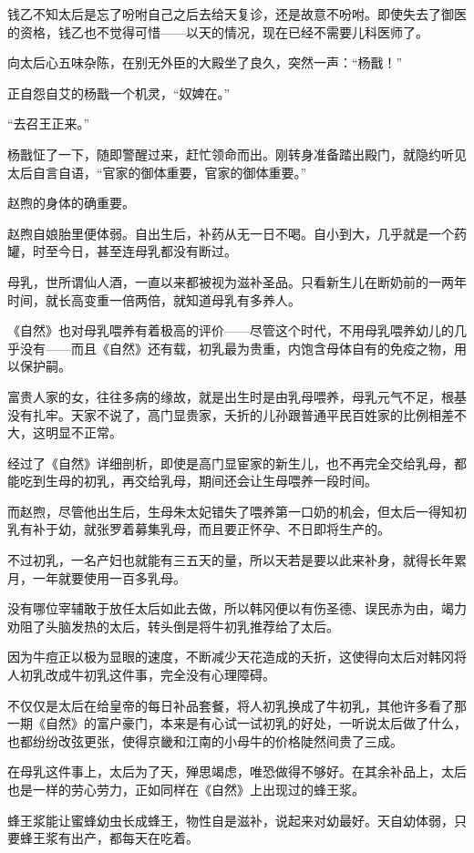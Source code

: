 钱乙不知太后是忘了吩咐自己之后去给天复诊，还是故意不吩咐。即使失去了御医的资格，钱乙也不觉得可惜——以天的情况，现在已经不需要儿科医师了。

向太后心五味杂陈，在别无外臣的大殿坐了良久，突然一声：“杨戬！”

正自怨自艾的杨戬一个机灵，“奴婢在。”

“去召王正来。”

杨戬怔了一下，随即警醒过来，赶忙领命而出。刚转身准备踏出殿门，就隐约听见太后自言自语，“官家的御体重要，官家的御体重要。”

赵煦的身体的确重要。

赵煦自娘胎里便体弱。自出生后，补药从无一日不喝。自小到大，几乎就是一个药罐，时至今日，甚至连母乳都没有断过。

母乳，世所谓仙人酒，一直以来都被视为滋补圣品。只看新生儿在断奶前的一两年时间，就长高变重一倍两倍，就知道母乳有多养人。

《自然》也对母乳喂养有着极高的评价——尽管这个时代，不用母乳喂养幼儿的几乎没有——而且《自然》还有载，初乳最为贵重，内饱含母体自有的免疫之物，用以保护嗣。

富贵人家的女，往往多病的缘故，就是出生时是由乳母喂养，母乳元气不足，根基没有扎牢。天家不说了，高门显贵家，夭折的儿孙跟普通平民百姓家的比例相差不大，这明显不正常。

经过了《自然》详细剖析，即使是高门显宦家的新生儿，也不再完全交给乳母，都能吃到生母的初乳，再交给乳母，期间还会让生母喂养一段时间。

而赵煦，尽管他出生后，生母朱太妃错失了喂养第一口奶的机会，但太后一得知初乳有补于幼，就张罗着募集乳母，而且要正怀孕、不日即将生产的。

不过初乳，一名产妇也就能有三五天的量，所以天若是要以此来补身，就得长年累月，一年就要使用一百多乳母。

没有哪位宰辅敢于放任太后如此去做，所以韩冈便以有伤圣德、误民赤为由，竭力劝阻了头脑发热的太后，转头倒是将牛初乳推荐给了太后。

因为牛痘正以极为显眼的速度，不断减少天花造成的夭折，这使得向太后对韩冈将人初乳改成牛初乳这件事，完全没有心理障碍。

不仅仅是太后在给皇帝的每日补品套餐，将人初乳换成了牛初乳，其他许多看了那一期《自然》的富户豪门，本来是有心试一试初乳的好处，一听说太后做了什么，也都纷纷改弦更张，使得京畿和江南的小母牛的价格陡然间贵了三成。

在母乳这件事上，太后为了天，殚思竭虑，唯恐做得不够好。在其余补品上，太后也是一样的劳心劳力，正如同样在《自然》上出现过的蜂王浆。

蜂王浆能让蜜蜂幼虫长成蜂王，物性自是滋补，说起来对幼最好。天自幼体弱，只要蜂王浆有出产，都每天在吃着。

